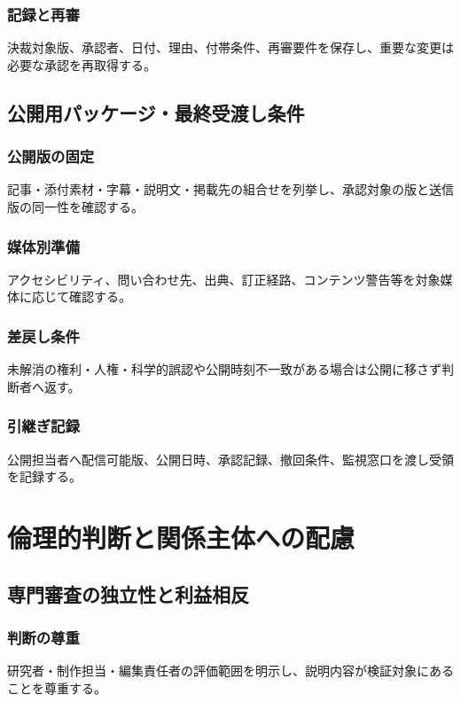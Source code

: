 \documentclass[a4paper,11pt]{article}
\begin{document}
\subsubsection{記録と再審}
\par 決裁対象版、承認者、日付、理由、付帯条件、再審要件を保存し、重要な変更は必要な承認を再取得する。\par\medskip
\subsection{公開用パッケージ・最終受渡し条件}
\subsubsection{公開版の固定}
\par 記事・添付素材・字幕・説明文・掲載先の組合せを列挙し、承認対象の版と送信版の同一性を確認する。\par\medskip
\subsubsection{媒体別準備}
\par アクセシビリティ、問い合わせ先、出典、訂正経路、コンテンツ警告等を対象媒体に応じて確認する。\par\medskip
\subsubsection{差戻し条件}
\par 未解消の権利・人権・科学的誤認や公開時刻不一致がある場合は公開に移さず判断者へ返す。\par\medskip
\subsubsection{引継ぎ記録}
\par 公開担当者へ配信可能版、公開日時、承認記録、撤回条件、監視窓口を渡し受領を記録する。\par\medskip
\section{倫理的判断と関係主体への配慮}
\subsection{専門審査の独立性と利益相反}
\subsubsection{判断の尊重}
\par 研究者・制作担当・編集責任者の評価範囲を明示し、説明内容が検証対象にあることを尊重する。\par\medskip
\end{document}
